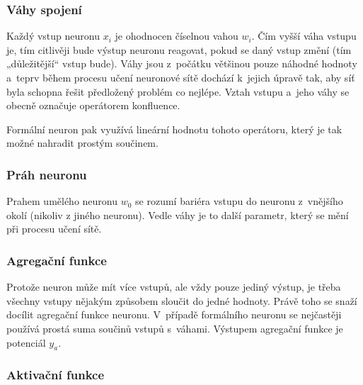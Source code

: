 \documentclass[a4paper,12pt]{article}
\begin{document}
{{{{\subsubsection{Váhy spojení}

Každý vstup neuronu $x_i$ je ohodnocen číselnou vahou $w_i$. Čím vyšší váha vstupu je, tím citlivěji bude výstup neuronu reagovat, pokud se daný vstup změní (tím „důležitější“ vstup bude). Váhy jsou z~počátku většinou pouze náhodné hodnoty a~teprv během procesu učení neuronové sítě dochází k~jejich úpravě tak, aby síť byla schopna řešit předložený problém co nejlépe. Vztah vstupu a~jeho váhy se obecně označuje operátorem konfluence.~\cite{nn}


Formální neuron pak využívá lineární hodnotu tohoto operátoru, který je tak možné nahradit prostým součinem.~\cite{nn}


\subsubsection{Práh neuronu}

Prahem umělého neuronu $w_0$ se rozumí bariéra vstupu do neuronu z~vnějšího okolí (nikoliv z jiného neuronu). Vedle váhy je to další parametr, který se mění při procesu učení sítě.~\cite{nn}

\subsubsection{Agregační funkce}

Protože neuron může mít více vstupů, ale vždy pouze jediný výstup, je třeba všechny vstupy nějakým způsobem sloučit do jedné hodnoty. Právě toho se snaží docílit agregační funkce neuronu. V~případě formálního neuronu se nejčastěji používá prostá suma součinů vstupů s~váhami. Výstupem agregační funkce je potenciál $y_a$.~\cite{nn}


\subsubsection{Aktivační funkce}

}}}}
\end{document}
